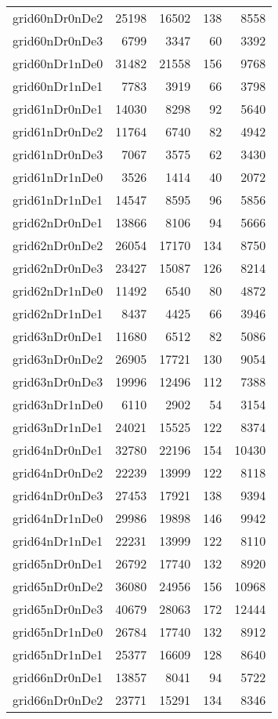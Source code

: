 \begin{longtable}{lrrrr}
grid60nDr0nDe2 & 25198 & 16502 & 138 & 8558 \\
grid60nDr0nDe3 & 6799 & 3347 & 60 & 3392 \\
grid60nDr1nDe0 & 31482 & 21558 & 156 & 9768 \\
grid60nDr1nDe1 & 7783 & 3919 & 66 & 3798 \\
grid61nDr0nDe1 & 14030 & 8298 & 92 & 5640 \\
grid61nDr0nDe2 & 11764 & 6740 & 82 & 4942 \\
grid61nDr0nDe3 & 7067 & 3575 & 62 & 3430 \\
grid61nDr1nDe0 & 3526 & 1414 & 40 & 2072 \\
grid61nDr1nDe1 & 14547 & 8595 & 96 & 5856 \\
grid62nDr0nDe1 & 13866 & 8106 & 94 & 5666 \\
grid62nDr0nDe2 & 26054 & 17170 & 134 & 8750 \\
grid62nDr0nDe3 & 23427 & 15087 & 126 & 8214 \\
grid62nDr1nDe0 & 11492 & 6540 & 80 & 4872 \\
grid62nDr1nDe1 & 8437 & 4425 & 66 & 3946 \\
grid63nDr0nDe1 & 11680 & 6512 & 82 & 5086 \\
grid63nDr0nDe2 & 26905 & 17721 & 130 & 9054 \\
grid63nDr0nDe3 & 19996 & 12496 & 112 & 7388 \\
grid63nDr1nDe0 & 6110 & 2902 & 54 & 3154 \\
grid63nDr1nDe1 & 24021 & 15525 & 122 & 8374 \\
grid64nDr0nDe1 & 32780 & 22196 & 154 & 10430 \\
grid64nDr0nDe2 & 22239 & 13999 & 122 & 8118 \\
grid64nDr0nDe3 & 27453 & 17921 & 138 & 9394 \\
grid64nDr1nDe0 & 29986 & 19898 & 146 & 9942 \\
grid64nDr1nDe1 & 22231 & 13999 & 122 & 8110 \\
grid65nDr0nDe1 & 26792 & 17740 & 132 & 8920 \\
grid65nDr0nDe2 & 36080 & 24956 & 156 & 10968 \\
grid65nDr0nDe3 & 40679 & 28063 & 172 & 12444 \\
grid65nDr1nDe0 & 26784 & 17740 & 132 & 8912 \\
grid65nDr1nDe1 & 25377 & 16609 & 128 & 8640 \\
grid66nDr0nDe1 & 13857 & 8041 & 94 & 5722 \\
grid66nDr0nDe2 & 23771 & 15291 & 134 & 8346 \\

\end{longtable}
